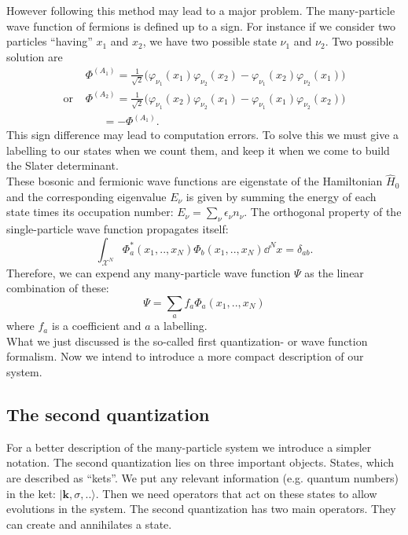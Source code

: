 \documentclass[../main.tex]{subfile}
\begin{document}
However following this method may lead to a major problem. The many-particle wave function of fermions is defined up to a sign. For instance if we consider
two particles ``having'' $x_1$ and $x_2$, we have two possible state $\nu_1$ and $\nu_2$. Two possible solution are
\begin{align*}
    &\Phi^{(A_1)} = \frac{1}{\sqrt{2}} \bigl(\varphi_{\nu_1} (x_1)\varphi_{\nu_2} (x_2) - \varphi_{\nu_1} (x_2)\varphi_{\nu_2} (x_1) \bigr)\\
    \text{or~} &\Phi^{(A_2)} = \frac{1}{\sqrt{2}} \bigl(\varphi_{\nu_1} (x_2)\varphi_{\nu_2}(x_1) - \varphi_{\nu_1} (x_1)\varphi_{\nu_2} (x_2)\bigr)\\
    &~~~~~~~=-\Phi^{(A_1)}.
\end{align*}
This sign difference may lead to computation errors. To solve this we must give a labelling to our states when we count them, and keep it when we 
come to build the Slater determinant.\\

These bosonic and fermionic wave functions are eigenstate of the Hamiltonian $\hat{H}_0$ and the corresponding eigenvalue $E_{\nu}$
is given by summing the energy of each state times its occupation number: $E_{\nu} = \sum_{\nu} \epsilon_{\nu} n_{\nu}$.
The orthogonal property of the single-particle wave function propagates itself:
\[
    \int_{\mathcal{X}^N} \Phi_a^{\ast}(x_1,..,x_N) \Phi_b(x_1,..,x_N) \dd^N x = \delta_{ab}.
\]
Therefore, we can expend any many-particle wave function $\Psi$ as the linear combination of these:
\[
    \Psi = \sum_a f_a \Phi_a(x_1,..,x_N)
\]
where $f_a$ is a coefficient and $a$ a labelling.\\

What we just discussed is the so-called first quantization- or wave function formalism. Now we intend to introduce a more compact description of our system. 

\subsection{The second quantization}
For a better description of the many-particle system we introduce a simpler notation. The second quantization lies on three important objects. 
States, which are described as ``kets''. We put any relevant information (e.g. quantum numbers) in the ket: $|\bm{k}, \sigma,..\rangle$. 
Then we need operators that act on these states to allow evolutions in the system. 
The second quantization has two main operators. They can create and annihilates a state.\\
\end{document}
